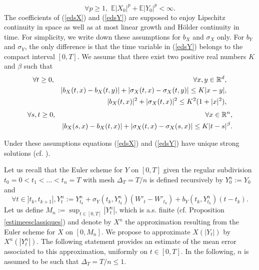 \documentclass[a4paper, 11pt]{article}
\newcommand{\R}{\mathbb{R}}
\newcommand{\E}{\mathbb{E}}
\newcommand{\1}{\mathbf{1}}
\begin{document}
\begin{equation}
\label{initial_val}
\forall p\geq 1, \, \, \E|X_0|^p+\E|Y_0|^p<\infty.
\end{equation}
The coefficients of (\ref{edsX}) and (\ref{edsY}) are supposed to enjoy Lipschitz continuity in space as well as at most linear growth and H\" older continuity in time. For simplicity, we write down these assumptions for $b_X$ and $\sigma_X$ only. For $b_Y$ and $\sigma_Y$, the only difference is that the time variable in (\ref{edsY}) belongs to the compact interval $[0,T]$. We assume that there exist two positive real numbers $K $ and $\beta$ such that
\begin{eqnarray}
&\forall t\geq 0,& \forall x,y\in \R^d,\notag\\
&&|b_X(t,x)-b_X(t,y)|+|\sigma_X(t,x)-\sigma_X(t,y)|\leq K|x-y|, \label{lipschitz_cond}\\
&&|b_X(t,x)|^2+|\sigma_X(t,x)|^2\leq K^2(1+|x|^2), \label{growth_cond}
\end{eqnarray}
\begin{eqnarray}
\label{holder_cond}
&\forall s, t\geq 0, &\forall x\in \R^n,\notag\\
&&|b_X(s,x)-b_X(t,x)|+|\sigma_X(t,x)-\sigma_X(s,x)|\leq K|t-s|^\beta.
\end{eqnarray}

\noindent Under these assumptions equations (\ref{edsX}) and (\ref{edsY}) have unique strong solutions (cf. \cite{kar}). 






\bigskip




\noindent Let us recall that the Euler scheme for $Y$ on $[0,T]$ given the regular subdivision $t_0=0<t_1<\ldots<t_n=T$ with mesh $\Delta_T=T/n$ is defined recursively by $Y_0^n:=Y_0$ and
\begin{equation}
\label{eulerpourY}
\forall t\in ]t_k, t_{k+1}], Y_t^n:=Y_{t_k}^n+\sigma_Y(t_k,Y_{t_k}^n)(W'_t-W'_{t_k})+b_Y(t_k,Y_{t_k}^n)(t-t_k).
\end{equation}
Let us define $M_n:=\sup_{t\in [0,T]} |Y_t^n|$, which is a.s. finite (cf. Proposition \ref{estimeesclassiques})  and denote by $X^n$ the approximation resulting from the Euler scheme for $X$ on $[0,M_n]$. We propose to approximate $X(|Y_t|)$ by $X^n(|Y^n_t|)$. The following statement provides an estimate of the mean error associated to this approximation, uniformly on $t\in [0,T]$. In the following, $n$ is assumed to be such that $\Delta_T=T/n\leq 1$.
\end{document}
